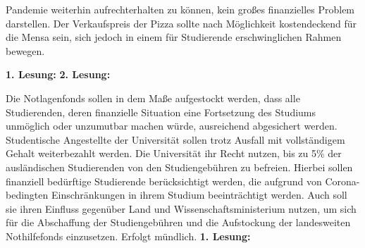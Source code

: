 {\begin{enumerate}
{                    Pandemie weiterhin aufrechterhalten zu können, kein großes finanzielles Problem darstellen. Der
                    Verkaufspreis der Pizza sollte nach Möglichkeit kostendeckend für die Mensa sein, sich jedoch in
                    einem für Studierende erschwinglichen Rahmen bewegen.
                }
            \end{enumerate}
        }{
            \textbf{1. Lesung:}
            \ul{}
            \textbf{2. Lesung:}
            \ul{}
        }{
        }
    
    {
        Die Notlagenfonds sollen in dem Maße aufgestockt werden, dass alle Studierenden,
        deren
        finanzielle Situation eine Fortsetzung des Studiums unmöglich oder unzumutbar machen
        würde,
        ausreichend abgesichert werden. Studentische Angestellte der Universität sollen trotz
        Ausfall mit
        vollständigem Gehalt weiterbezahlt werden.
        Die Universität ihr Recht nutzen, bis zu 5\% der ausländischen Studierenden von den
        Studiengebühren zu befreien. Hierbei sollen finanziell bedürftige Studierende
        berücksichtigt
        werden, die aufgrund von Corona-bedingten Einschränkungen in ihrem Studium
        beeinträchtigt
        werden. Auch soll sie ihren Einfluss gegenüber Land und Wissenschaftsministerium
        nutzen, um
        sich für die Abschaffung der Studiengebühren und die Aufstockung der landesweiten
        Nothilfefonds
        einzusetzen.
    }{
        Erfolgt mündlich.
    }{
        \textbf{1. Lesung:}
        \ul{}
    }{
    }
